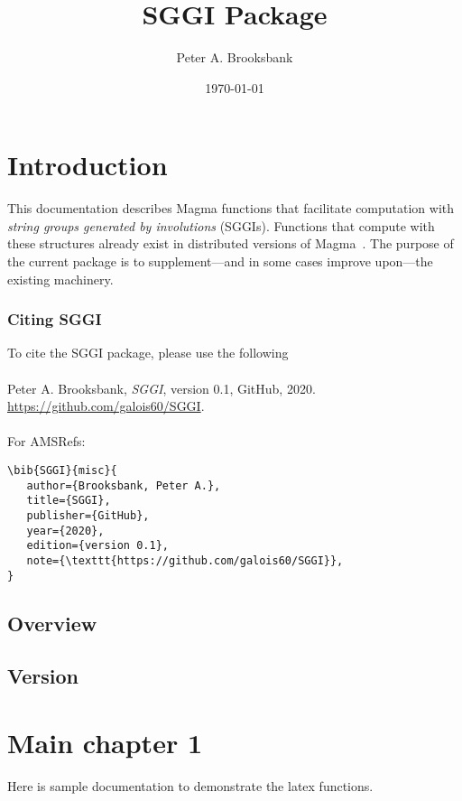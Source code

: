 \documentclass{documentation}
\title{SGGI Package}
\author{Peter A. Brooksbank}
\date{\today}
\begin{document}
\frontmatter

\dominitoc
\maketitle
\tableofcontents

\mainmatter

\chapter{Introduction}

This documentation describes {\sc Magma} functions that facilitate computation with {\em string groups generated by involutions} (SGGIs). 
Functions that compute with these structures already exist in distributed versions of {\sc Magma}~\cite{Magma}. The purpose of the 
current package is to supplement---and in some cases improve upon---the existing machinery.

\subsection*{Citing SGGI} 
To cite the SGGI package, please use the following\\
\\
Peter A. Brooksbank, \emph{SGGI}, version 0.1, GitHub, 2020. \url{https://github.com/galois60/SGGI}. \\
\\
For AMSRefs:
\begin{verbatim}
\bib{SGGI}{misc}{
   author={Brooksbank, Peter A.},
   title={SGGI},
   publisher={GitHub},
   year={2020},
   edition={version 0.1},
   note={\texttt{https://github.com/galois60/SGGI}},
}
\end{verbatim}

\section{Overview}

\section{Version}

\chapter{Main chapter 1}


Here is sample documentation to demonstrate the latex functions.
\end{document}
